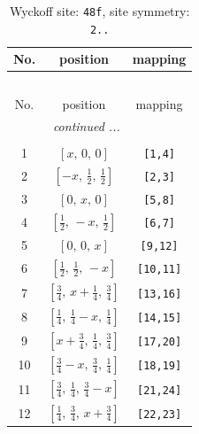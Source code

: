 \documentclass[fleqn,8pt]{jsarticle}
\begin{document}
\begin{longtable}{ccc}
\caption{Wyckoff site: {\tt 48f}, site symmetry: {\tt 2..}}
 \\
 \hline \hline
No. & position & mapping \\ \hline \endfirsthead

\multicolumn{2}{l}{\tablename\ \thetable{}} \\
 \hline \hline
No. & position & mapping \\ \hline \endhead

 \hline \hline
\multicolumn{2}{r}{\footnotesize\it continued ...} \\ \endfoot

 \hline \hline
\multicolumn{2}{r}{} \\ \endlastfoot

1 & $\left[ x,\, 0,\, 0 \right]$ & {\tt [1,4]} \\ \hline
2 & $\left[ - x,\, \frac{1}{2},\, \frac{1}{2} \right]$ & {\tt [2,3]} \\ \hline
3 & $\left[ 0,\, x,\, 0 \right]$ & {\tt [5,8]} \\ \hline
4 & $\left[ \frac{1}{2},\, - x,\, \frac{1}{2} \right]$ & {\tt [6,7]} \\ \hline
5 & $\left[ 0,\, 0,\, x \right]$ & {\tt [9,12]} \\ \hline
6 & $\left[ \frac{1}{2},\, \frac{1}{2},\, - x \right]$ & {\tt [10,11]} \\ \hline
7 & $\left[ \frac{3}{4},\, x + \frac{1}{4},\, \frac{3}{4} \right]$ & {\tt [13,16]} \\ \hline
8 & $\left[ \frac{1}{4},\, \frac{1}{4} - x,\, \frac{1}{4} \right]$ & {\tt [14,15]} \\ \hline
9 & $\left[ x + \frac{3}{4},\, \frac{1}{4},\, \frac{3}{4} \right]$ & {\tt [17,20]} \\ \hline
10 & $\left[ \frac{3}{4} - x,\, \frac{3}{4},\, \frac{1}{4} \right]$ & {\tt [18,19]} \\ \hline
11 & $\left[ \frac{3}{4},\, \frac{1}{4},\, \frac{3}{4} - x \right]$ & {\tt [21,24]} \\ \hline
12 & $\left[ \frac{1}{4},\, \frac{3}{4},\, x + \frac{3}{4} \right]$ & {\tt [22,23]} \\
\end{longtable}
\renewcommand{\arraystretch}{1.2}
\end{document}

